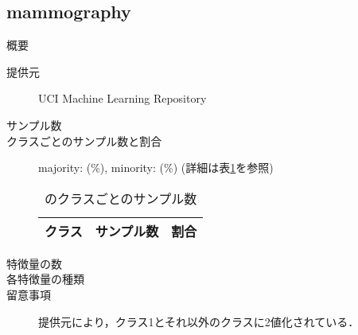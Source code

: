 \subsection{mammography}
\begin{description}
    \item[概要] \cite{}
    \item[提供元] UCI Machine Learning Repository
    \item[サンプル数] 
    \item[クラスごとのサンプル数と割合] majority:  (\%), minority:  (\%) (詳細は表\ref{tab:}を参照)

        \begin{table}
            \centering
            \caption{のクラスごとのサンプル数}
            \label{tab:}
            \begin{tabular}{lrc} \hline
                \multicolumn{1}{c}{クラス}&
                \multicolumn{1}{c}{サンプル数}&
                \multicolumn{1}{c}{割合}\\
                \hline
                \hline

                \hline
            \end{tabular}
        \end{table}

    \item[特徴量の数] 
    \item[各特徴量の種類] \mbox{}
        
    \item[留意事項] 提供元により，クラス1とそれ以外のクラスに2値化されている．
\end{description}


